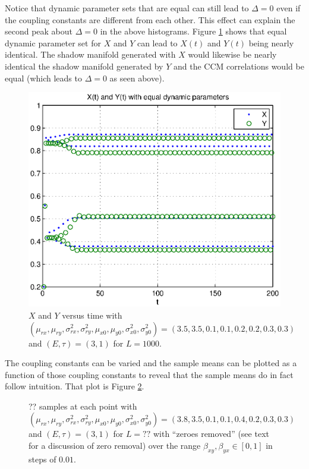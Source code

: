 \documentclass[a4paper,11pt]{article}
\begin{document}
Notice that dynamic parameter sets that are equal can still lead to $\Delta=0$ even if the coupling constants are different from each other.  This effect can explain the second peak about $\Delta=0$ in the above histograms.  Figure \ref{fig:TwoPopDynSameParms} shows that equal dynamic parameter set for $X$ and $Y$ can lead to $X(t)$ and $Y(t)$ being nearly identical.  The shadow manifold generated with $X$ would likewise be nearly identical the shadow manifold generated by $Y$ and the CCM correlations would be equal (which leads to $\Delta=0$ as seen above).  
\begin{figure}[h!t]
\centering
\label{fig:TwoPopDynSameParms}
\includegraphics[scale=0.55]{graphics/TwoPopDynSameParms.eps}
\caption{$X$ and $Y$ versus time with $\left(\mu_{rx},\mu_{ry},\sigma^2_{rx},\sigma^2_{ry},\mu_{x0},\mu_{y0},\sigma^2_{x0},\sigma^2_{y0}\right) = \left(3.5,3.5,0.1,0.1,0.2,0.2,0.3,0.3\right)$ and $\left(E,\tau\right)=\left(3,1\right)$ for $L=1000$.}
\end{figure}

The coupling constants can be varied and the sample means can be plotted as a function of those coupling constants to reveal that the sample means do in fact follow intuition.  That plot is Figure \ref{fig:TwoPopSamplByxBxy}.
\begin{figure}[h!t]
\centering
\label{fig:TwoPopSamplByxBxy}
\caption{?? samples at each point with $\left(\mu_{rx},\mu_{ry},\sigma^2_{rx},\sigma^2_{ry},\mu_{x0},\mu_{y0},\sigma^2_{x0},\sigma^2_{y0}\right) = \left(3.8,3.5,0.1,0.1,0.4,0.2,0.3,0.3\right)$ and $\left(E,\tau\right)=\left(3,1\right)$ for $L=??$ with ``zeroes removed'' (see text for a discussion of zero removal) over the range $\beta_{xy},\beta_{yx}\in[0,1]$ in steps of $0.01$.}
\end{figure}
\end{document}
